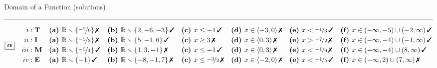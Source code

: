 \documentclass[10pt]{report}
\begin{document}
\newpage
\begin{landscape}
\begin{center}
{\huge Domain of a Function (solutions)}\\[4mm]
\begin{varwidth}{\linewidth}
\begin{center}
\footnotesize
\rule[1mm]{\linewidth}{0.5pt}
$\boxed{\bm{\alpha}} \quad \begin{aligned}
\romannumeral1 : \; &\textbf{T} 
 &&\mathrm{\textbf{(a) }}  \mathbb{R} \smallsetminus\{\nicefrac{-7}{9} \}\,\text{\ding{55}}
 &&\mathrm{\textbf{(b) }}  \mathbb{R} \smallsetminus\{2,-6,-3 \}\,\text{\ding{51}}
 &&\mathrm{\textbf{(c) }} x\leq-1\,\text{\ding{51}}
 &&\mathrm{\textbf{(d) }} x\in\langle-3 , 0\rangle\,\text{\ding{55}}
 &&\mathrm{\textbf{(e) }} x<\nicefrac{-1}{3}\,\text{\ding{51}}
 &&\mathrm{\textbf{(f) }} x\in(-\infty , -5)\cup(-2 , \infty)\,\text{\ding{51}}
\\[-0.2mm]
\romannumeral2 : \; &\textbf{I} 
 &&\mathrm{\textbf{(a) }}  \mathbb{R} \smallsetminus\{\nicefrac{-5}{3} \}\,\text{\ding{55}}
 &&\mathrm{\textbf{(b) }}  \mathbb{R} \smallsetminus\{5,-1,6 \}\,\text{\ding{51}}
 &&\mathrm{\textbf{(c) }} x\geq3\,\text{\ding{55}}
 &&\mathrm{\textbf{(d) }} x\in\langle0 , 3\rangle\,\text{\ding{55}}
 &&\mathrm{\textbf{(e) }} x>\nicefrac{-7}{2}\,\text{\ding{55}}
 &&\mathrm{\textbf{(f) }} x\in(-\infty , -4)\cup(-1 , \infty)\,\text{\ding{51}}
\\[-0.2mm]
\romannumeral3 : \; &\textbf{M} 
 &&\mathrm{\textbf{(a) }}  \mathbb{R} \smallsetminus\{\nicefrac{-5}{4} \}\,\text{\ding{51}}
 &&\mathrm{\textbf{(b) }}  \mathbb{R} \smallsetminus\{1,3,-1 \}\,\text{\ding{55}}
 &&\mathrm{\textbf{(c) }} x\leq-1\,\text{\ding{51}}
 &&\mathrm{\textbf{(d) }} x\in\langle0 , 3\rangle\,\text{\ding{55}}
 &&\mathrm{\textbf{(e) }} x<\nicefrac{-1}{6}\,\text{\ding{55}}
 &&\mathrm{\textbf{(f) }} x\in(-\infty , -4)\cup(8 , \infty)\,\text{\ding{51}}
\\[-0.2mm]
\romannumeral4 : \; &\textbf{E} 
 &&\mathrm{\textbf{(a) }}  \mathbb{R} \smallsetminus\{-1 \}\,\text{\ding{51}}
 &&\mathrm{\textbf{(b) }}  \mathbb{R} \smallsetminus\{-8,-1,7 \}\,\text{\ding{55}}
 &&\mathrm{\textbf{(c) }} x\leq\nicefrac{-3}{2}\,\text{\ding{55}}
 &&\mathrm{\textbf{(d) }} x\in\langle-2 , 0\rangle\,\text{\ding{55}}
 &&\mathrm{\textbf{(e) }} x<\nicefrac{-1}{5}\,\text{\ding{51}}
 &&\mathrm{\textbf{(f) }} x\in(-\infty , 2)\cup(7 , \infty)\,\text{\ding{55}}
\end{aligned} $

\end{center}
\end{varwidth}
\end{center}
\end{landscape}
\end{document}
